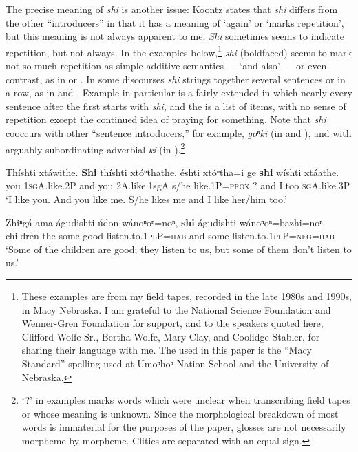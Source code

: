 \documentclass[output=paper]{LSP/langsci}
\begin{document}
The precise meaning of \textit{shi} is another issue:  Koontz states that \textit{shi} differs from the other ``introducers'' in that it has a meaning of `again' or `marks repetition', but this meaning is not always apparent to me. \textit{Shi} sometimes seems to indicate repetition, but not always.  In the examples below,\footnote{These examples are from my field tapes, recorded in the late 1980s and 1990s, in Macy Nebraska. I am grateful to the National Science Foundation and Wenner-Gren Foundation for support, and to the speakers quoted here, Clifford Wolfe Sr., Bertha Wolfe, Mary Clay, and Coolidge Stabler, for sharing their language with me. The  used in this paper is the ``Macy Standard'' spelling used at Umoⁿhoⁿ Nation School and the University of Nebraska.}   \textit{shi} (boldfaced) seems to mark not so much repetition as simple additive  semantics --- `and also' --- or even contrast, as in  or .  In some discourses \textit{shi} strings together several sentences or  in a row, as in  and .  Example  in particular is a fairly extended  in which nearly every sentence after the first starts with \textit{shi}, and the  is a list of items, with no sense of repetition except the continued idea of praying for something. Note that \textit{shi} cooccurs with other ``sentence introducers,'' for example, \textit{goⁿki} (in  and ), and with arguably subordinating adverbial \textit{ki} (in ).\footnote{`?' in examples marks words which were unclear when transcribing field tapes or whose meaning is unknown. Since the morphological breakdown of most words is immaterial for the purposes of the paper, glosses are not necessarily morpheme-by-morpheme. Clitics are separated with an equal sign.}

\ea \label{ex:rudin:7}
\gll Thíshti  xtáwithe.  \textbf{Shi} thíshti xtóⁿthathe.  éshti  xtóⁿtha=i  ge \textbf{shi}  wíshti xtáathe.\\
 	you   	\textsc{1sgA}.like.2P  and 	you     	2A.like.{1sgA}  	s/he   	like.1P=\textsc{prox}  	?  	and  	I.too  	\textsc{sgA}.like.3P\\
\trans `I like you.  And you like me.  S/he likes me and I like her/him too.'

\ex\label{ex:rudin:8} 
\gll  Zhiⁿgá  ama águdishti údon  wánoⁿoⁿ=noⁿ, \textbf{shi}  águdishti  wánoⁿoⁿ=bazhi=noⁿ.\\
children 	the 	some        	good  	listen.to.\textsc{1plP=hab} 	and some listen.to.\textsc{1plP}=\textsc{neg=hab}\\
\trans `Some of the children are good; they listen to us, but some of them don't listen to us.'
\end{document}
